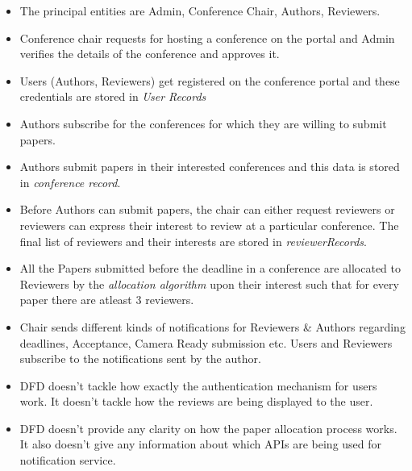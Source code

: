 \documentclass[english,a4paper,12pt]{report}
\begin{document}
\begin{enumerate}
\begin{itemize}
    \item The principal entities are Admin, Conference Chair, Authors, Reviewers. 
    \item Conference chair requests for hosting a conference on the portal and Admin verifies the details of the conference and approves it.
    \item Users (Authors, Reviewers) get registered on the conference portal and these credentials are stored in \textit{User Records}
    \item Authors subscribe for the conferences for which they are willing to submit papers.
    \item Authors submit papers in their interested conferences and this data  is stored in \textit{conference record}.
    \item Before Authors can submit papers, the chair can either request reviewers or reviewers can express their interest to review at a particular conference. The final list of reviewers and their interests are stored in \textit{reviewerRecords}.
    \item All the Papers submitted before the deadline in a conference are allocated to Reviewers by the \textit{allocation algorithm} upon their interest such that for every paper there are atleast 3 reviewers.
    \item Chair sends different kinds of notifications for Reviewers \&  Authors regarding deadlines, Acceptance, Camera Ready submission etc. Users and Reviewers subscribe to the notifications sent by the author.
    \item DFD doesn't tackle how exactly the authentication mechanism for users work. It doesn't tackle how the reviews are being displayed to the user.
    \item DFD doesn't provide any clarity on how the paper allocation process works. It also doesn't give any information about which APIs are being used for notification service.
\end{itemize}


\end{enumerate}
\end{document}

